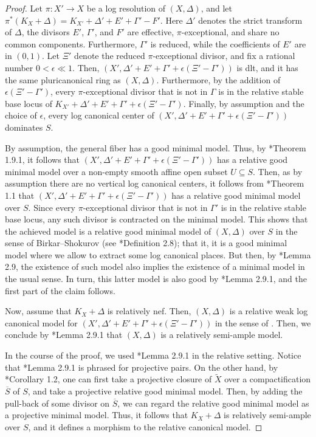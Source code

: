 \documentclass{amsart}
\theoremstyle{definition}
\newcommand{\rar}{\rightarrow}
\def\K#1.{K_{#1}}
\begin{document}
\begin{proof}
Let $\pi \colon X' \rar X$ be a log resolution of $(X,\Delta)$, and let $\pi^*(K_X+\Delta)= \K X'. + \Delta' + E' + \Gamma' - F'$.
Here $\Delta'$ denotes the strict transform of $\Delta$, the divisors $E'$, $\Gamma'$, and $F'$ are effective, $\pi$-exceptional, and share no common components.
Furthermore, $\Gamma'$ is reduced, while the coefficients of $E'$ are in $(0,1)$.
Let $\Xi'$ denote the reduced $\pi$-exceptional divisor, and fix a rational number $0 < \epsilon \ll 1$.
Then, $(X',\Delta' + E' + \Gamma' + \epsilon (\Xi' - \Gamma'))$ is dlt, and it has the same pluricanonical ring as $(X,\Delta)$.
Furthermore, by the addition of $\epsilon (\Xi' - \Gamma')$, every $\pi$-exceptional divisor that is not in $\Gamma$ is in the relative stable base locus of $\K X'. +\Delta' + E' + \Gamma' + \epsilon (\Xi' - \Gamma')$.
Finally, by assumption and the choice of $\epsilon$, every log canonical center of $(X',\Delta' + E' + \Gamma' + \epsilon (\Xi' - \Gamma'))$ dominates $S$.

By assumption, the general fiber has a good minimal model.
Thus, by \cite{HMX18}*{Theorem 1.9.1}, it follows that $(X',\Delta' + E' + \Gamma' + \epsilon (\Xi' - \Gamma'))$ has a relative good minimal model over a non-empty smooth affine open subset $U \subseteq S$.
Then, as by assumption there are no vertical log canonical centers, it follows from \cite{HX13}*{Theorem 1.1} that $(X',\Delta' + E' + \Gamma' + \epsilon (\Xi' - \Gamma'))$ has a relative good minimal model over $S$.
Since every $\pi$-exceptional divisor that is not in $\Gamma'$ is in the relative stable base locus, any such divisor is contracted on the minimal model.
This shows that the achieved model is a relative good minimal model of $(X,\Delta)$ over $S$ in the sense of Birkar--Shokurov (see \cite{LT22}*{Definition 2.8}); that it, it is a good minimal model where we allow to extract some log canonical places.
But then, by \cite{LT22}*{Lemma 2.9}, the existence of such model also implies the existence of a minimal model in the usual sense.
In turn, this latter model is also good by \cite{HMX}*{Lemma 2.9.1}, and the first part of the claim follows.

Now, assume that $K_X + \Delta$ is relatively nef.
Then, $(X,\Delta)$ is a relative weak log canonical model for $(X',\Delta' + E' + \Gamma' + \epsilon (\Xi' - \Gamma'))$ in the sense of \cite{HMX}.
Then, we conclude by \cite{HMX}*{Lemma 2.9.1} that $(X,\Delta)$ is a relatively semi-ample model.

In the course of the proof, we used \cite{HMX}*{Lemma 2.9.1} in the relative setting.
Notice that \cite{HMX}*{Lemma 2.9.1} is phrased for projective pairs.
On the other hand, by \cite{HX13}*{Corollary 1.2}, one can first take a projective closure of $\tilde X$ over a compactification $\overline{S}$ of $S$, and take a projective relative good minimal model.
Then, by adding the pull-back of some divisor on $\overline{S}$, we can regard the relative good minimal model as a projective minimal model.
Thus, it follows that $K_{X} + \Delta$ is relatively semi-ample over $S$, and it defines a morphism to the relative canonical model.
\end{proof}
\end{document}
